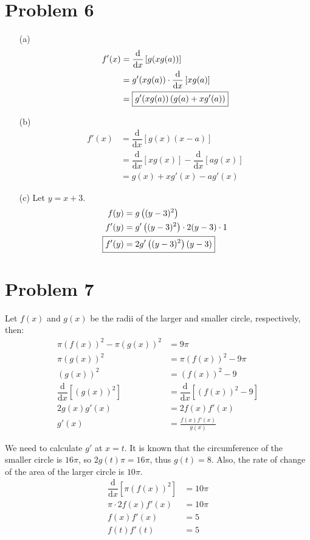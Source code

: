 \documentclass{article}
\newcommand*{\paren}[1]{\ensuremath\left(#1\right)}
\newcommand*{\problem}[1]{\section*{Problem #1}}
\newcommand*{\Deriv}[2][x]{\ensuremath{\dfrac{\mathrm{d}}{\mathrm{d}#1}\left[#2\right]}}
\begin{document}
\problem{6}
\begin{multicols}{2}
	\allowdisplaybreaks[0]
	\begin{itemize}
		\item[(a)]
		\begin{align*}
			f'(x)&=\Deriv{g(xg(a))} \\
			&=g'(xg(a))\cdot\Deriv{xg(a)} \\
			&=\boxed{g'(xg(a))\paren{g(a)+xg'(a)}} \\
		\end{align*}

		\item[(b)]
		\begin{align*}
			f'(x)&=\Deriv{g(x)(x-a)}\\
			&=\Deriv{xg(x)}-\Deriv{ag(x)} \\
			&=\boxed{g(x)+xg'(x)-ag'(x)}
		\end{align*}

		\item[(c)]
		Let $y=x+3$.
		\begin{align*}
			f(y)&=g\paren{(y-3)^2} \\
			f'(y)&=g'\paren{(y-3)^2}\cdot2(y-3)\cdot1 \\
			\Aboxed{f'(y)&=2g'\paren{(y-3)^2}(y-3)}
		\end{align*}
	\end{itemize}
	\allowdisplaybreaks
\end{multicols}

\problem{7}
Let $f(x)$ and $g(x)$ be the radii of the larger and smaller circle, respectively, then:
\begin{align*}
	\pi(f(x))^2-\pi(g(x))^2&=9\pi \\
	\pi(g(x))^2&=\pi(f(x))^2-9\pi \\
	(g(x))^2&=(f(x))^2-9 \\
	\Deriv{(g(x))^2}&=\Deriv{(f(x))^2-9} \\
	2g(x)g'(x)&=2f(x)f'(x) \\
	g'(x)&=\frac{f(x)f'(x)}{g(x)} \tag{1}
\end{align*}

We need to calculate $g'$ at $x=t$. It is known that the circumference of the smaller circle is $16\pi$, so $2g(t)\pi=16\pi$, thus $g(t)=8$. Also, the rate of change of the area of the larger circle is $10\pi$.
\begin{align*}
	\Deriv{\pi(f(x))^2}&=10\pi \\
	\pi\cdot2f(x)f'(x)&=10\pi \\
	f(x)f'(x)&=5 \\
	f(t)f'(t)&=5
\end{align*}
\end{document}
